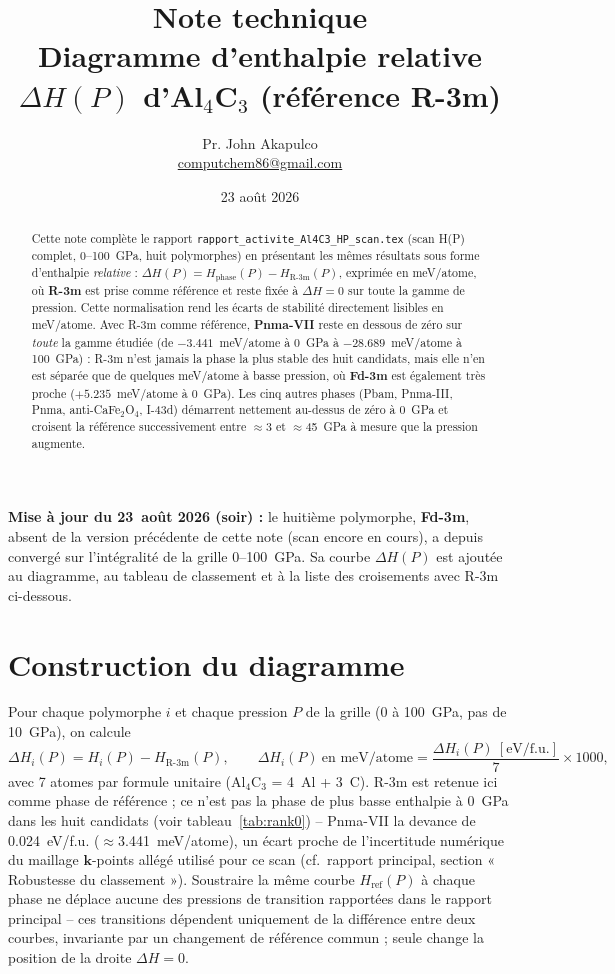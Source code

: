 \documentclass[11pt,a4paper]{article}
\title{\vspace{-1.5cm}Note technique\\[2pt]
\large Diagramme d'enthalpie relative $\Delta H(P)$ d'Al$_4$C$_3$ (référence R-3m)}
\author{Pr. John Akapulco \\ \small \href{mailto:computchem86@gmail.com}{computchem86@gmail.com}}
\date{23 août 2026}
\begin{document}
\maketitle
\vspace{-0.5cm}

\begin{abstract}
\noindent
Cette note complète le rapport \texttt{rapport\_activite\_Al4C3\_HP\_scan.tex} (scan H(P)
complet, 0--100~GPa, huit polymorphes) en présentant les mêmes résultats sous forme
d'enthalpie \emph{relative} : $\Delta H(P) = H_{\text{phase}}(P) - H_{\text{R-3m}}(P)$, exprimée
en meV/atome, où \textbf{R-3m} est prise comme référence et reste fixée à $\Delta H = 0$ sur
toute la gamme de pression. Cette normalisation rend les écarts de stabilité directement
lisibles en meV/atome. Avec R-3m comme référence, \textbf{Pnma-VII} reste en dessous de zéro
sur \emph{toute} la gamme étudiée (de $-3.441$~meV/atome à 0~GPa à $-28.689$~meV/atome à
100~GPa) : R-3m n'est jamais la phase la plus stable des huit candidats, mais elle n'en est
séparée que de quelques meV/atome à basse pression, où \textbf{Fd-3m} est également très proche
($+5.235$~meV/atome à 0~GPa). Les cinq autres phases (Pbam, Pnma-III, Pnma,
anti-CaFe$_2$O$_4$, I-43d) démarrent nettement au-dessus de zéro à 0~GPa et croisent la
référence successivement entre $\approx$3 et $\approx$45~GPa à mesure que la pression
augmente.
\end{abstract}

\medskip
\noindent\textbf{Mise à jour du 23~août 2026 (soir) :} le huitième polymorphe, \textbf{Fd-3m},
absent de la version précédente de cette note (scan encore en cours), a depuis convergé sur
l'intégralité de la grille 0--100~GPa. Sa courbe $\Delta H(P)$ est ajoutée au diagramme, au
tableau de classement et à la liste des croisements avec R-3m ci-dessous.

\section{Construction du diagramme}

Pour chaque polymorphe $i$ et chaque pression $P$ de la grille (0 à 100~GPa, pas de 10~GPa),
on calcule
\[
\Delta H_i(P) = H_i(P) - H_{\text{R-3m}}(P), \qquad
\Delta H_i(P)\ \text{en meV/atome} = \frac{\Delta H_i(P)\ [\text{eV/f.u.}]}{7}\times 1000,
\]
avec 7 atomes par formule unitaire (Al$_4$C$_3$ = 4~Al + 3~C). R-3m est retenue ici comme phase
de référence ; ce n'est pas la phase de plus basse enthalpie à 0~GPa dans les huit candidats
(voir tableau~\ref{tab:rank0}) -- Pnma-VII la devance de 0.024~eV/f.u.
($\approx$3.441~meV/atome), un écart proche de l'incertitude numérique du maillage
$\mathbf{k}$-points allégé utilisé pour ce scan (cf.\ rapport principal, section
« Robustesse du classement »). Soustraire la même courbe $H_{\text{ref}}(P)$ à chaque phase ne
déplace aucune des pressions de transition rapportées dans le rapport principal -- ces
transitions dépendent uniquement de la différence entre deux courbes, invariante par un
changement de référence commun ; seule change la position de la droite $\Delta H = 0$.
\end{document}
